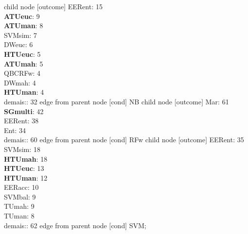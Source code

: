 child {node [outcome] {EERent: 15\\
\textbf{ATUeuc}: 9\\
\textbf{ATUman}: 8\\
SVMsim: 7\\
DWeuc: 6\\
\textbf{HTUeuc}: 5\\
\textbf{ATUmah}: 5\\
QBCRFw: 4\\
DWmah: 4\\
\textbf{HTUman}: 4\\
demais:: 32} edge from parent node [cond] {NB}}
child {node [outcome] {Mar: 61\\
\textbf{SGmulti}: 42\\
EERent: 38\\
Ent: 34\\
demais:: 60} edge from parent node [cond] {RFw}}
child {node [outcome] {EERent: 35\\
SVMsim: 18\\
\textbf{HTUmah}: 18\\
\textbf{HTUeuc}: 13\\
\textbf{HTUman}: 12\\
EERacc: 10\\
SVMbal: 9\\
TUmah: 9\\
TUman: 8\\
demais:: 62} edge from parent node [cond] {SVM}};
